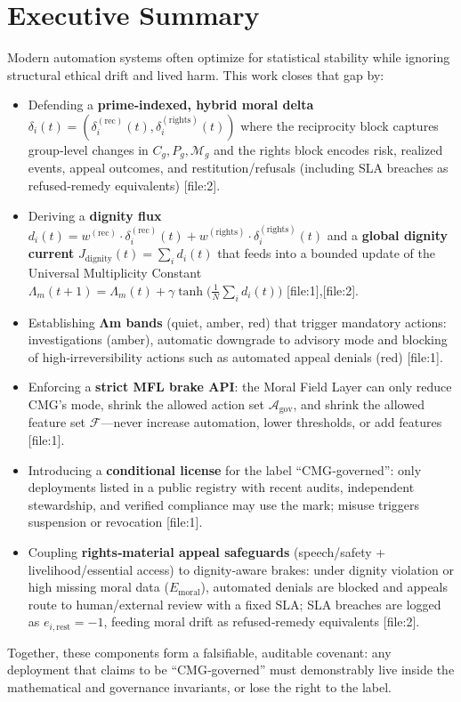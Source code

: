 \documentclass[11pt]{article}
\begin{document}
\section*{Executive Summary}
Modern automation systems often optimize for statistical stability while ignoring structural ethical drift and lived harm. This work closes that gap by:
\begin{itemize}
  \item Defending a \textbf{prime‑indexed, hybrid moral delta} $\delta_i(t) = (\delta_i^{(\text{rec})}(t),\delta_i^{(\text{rights})}(t))$ where the reciprocity block captures group‑level changes in $C_g,P_g,\mathcal{M}_g$ and the rights block encodes risk, realized events, appeal outcomes, and restitution/refusals (including SLA breaches as refused‑remedy equivalents) {[file:2]}.
  \item Deriving a \textbf{dignity flux} $d_i(t)=w^{(\text{rec})}\cdot\delta_i^{(\text{rec})}(t)+w^{(\text{rights})}\cdot\delta_i^{(\text{rights})}(t)$ and a \textbf{global dignity current} $J_{\text{dignity}}(t)=\sum_i d_i(t)$ that feeds into a bounded update of the Universal Multiplicity Constant $\Lambda_m(t+1)=\Lambda_m(t)+\gamma\tanh\big(\frac{1}{N}\sum_i d_i(t)\big)$ {[file:1],[file:2]}.
  \item Establishing \textbf{Λm bands} (quiet, amber, red) that trigger mandatory actions: investigations (amber), automatic downgrade to advisory mode and blocking of high‑irreversibility actions such as automated appeal denials (red) {[file:1]}.
  \item Enforcing a \textbf{strict MFL brake API}: the Moral Field Layer can only reduce CMG’s mode, shrink the allowed action set $\mathcal{A}_{\text{gov}}$, and shrink the allowed feature set $\mathcal{F}$—never increase automation, lower thresholds, or add features {[file:1]}.
  \item Introducing a \textbf{conditional license} for the label “CMG‑governed”: only deployments listed in a public registry with recent audits, independent stewardship, and verified compliance may use the mark; misuse triggers suspension or revocation {[file:1]}.
  \item Coupling \textbf{rights‑material appeal safeguards} (speech/safety + livelihood/essential access) to dignity‑aware brakes: under dignity violation or high missing moral data ($E_{\text{moral}}$), automated denials are blocked and appeals route to human/external review with a fixed SLA; SLA breaches are logged as $e_{i,\text{rest}}=-1$, feeding moral drift as refused‑remedy equivalents {[file:2]}.
\end{itemize}
Together, these components form a falsifiable, auditable covenant: any deployment that claims to be “CMG‑governed” must demonstrably live inside the mathematical and governance invariants, or lose the right to the label.
\end{document}
